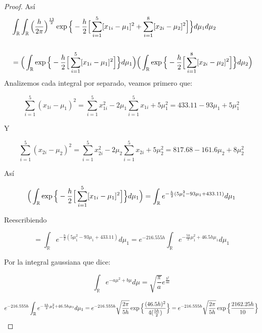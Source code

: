 \documentclass[11pt,letterpaper]{article}
\begin{document}
\begin{proof}
    Así
    \begin{align*}
        &\int_{\mathbb{R}}\int_{\mathbb{R}}\Big{(}\frac{h}{2\pi}\Big{)}^\frac{13}{2}\exp\Big{\{}-\frac{h}{2}\Big{[}\sum_{i=1}^5[x_{1i}-\mu_1]^2+\sum_{i=1}^8[x_{2i}-\mu_2]^2\Big{]}\Big{\}}d\mu_1d\mu_2 \\
        \,\\
        &=\Big{(}\int_{\mathbb{R}}\exp\Big{\{}-\frac{h}{2}\Big{[}\sum_{i=1}^5[x_{1i}-\mu_1]^2\Big{]}\Big{\}}d\mu_1\Big{)}\Big{(}\int_{\mathbb{R}}\exp\Big{\{}-\frac{h}{2}\Big{[}\sum_{i=1}^8[x_{2i}-\mu_2]^2\Big{]}\Big{\}}d\mu_2\Big{)}
    \end{align*}
    Analizemos cada integral por separado, veamos primero que:

    \begin{equation*}
        \sum_{i=1}^5(x_{1i}-\mu_1)^2=\sum_{i=1}^5x_{1i}^2-2\mu_1\sum_{i=1}^5x_{1i}+5\mu_1^2=433.11-93\mu_1+5\mu_1^2
    \end{equation*}

    Y

    \begin{equation*}
        \sum_{i=1}^5(x_{2i}-\mu_2)^2=\sum_{i=1}^5x_{2i}^2-2\mu_2\sum_{i=1}^5x_{2i}+5\mu_2^2=817.68-161.6\mu_2+8\mu_2^2
    \end{equation*}

    Así
    
    \begin{equation*}
        \Big{(}\int_{\mathbb{R}}\exp\Big{\{}-\frac{h}{2}\Big{[}\sum_{i=1}^5[x_{1i}-\mu_1]^2\Big{]}\Big{\}}d\mu_1\Big{)}=\int_{\mathbb{R}}e^{-\frac{h}{2}(5\mu_1^2-93\mu_1+433.11)}d\mu_1
    \end{equation*}

    Reescribiendo

    \begin{equation*}
        =\int_{\mathbb{R}}e^{-\frac{h}{2}(5\mu_1^2-93\mu_1+433.11)}d\mu_1=e^{-216.555h}\int_{\mathbb{R}}e^{-\frac{5h}{2}\mu_1^2+46.5h\mu_1}d\mu_1
    \end{equation*}

    Por la integral gaussiana que dice:

    \[
    \int_\mathbb{R}e^{-a\mu^2+b\mu}d\mu=\sqrt{\frac{\pi}{a}}e^{\frac{b^2}{4a}}
    \]

    \begin{equation*}
        e^{-216.555h}\int_{\mathbb{R}}e^{-\frac{5h}{2}\mu_1^2+46.5h\mu_1}d\mu_1=e^{-216.555h}\sqrt{\frac{2\pi}{5h}}\exp\Big{\{}\frac{(46.5h)^2}{4(\frac{5h}{2})}\Big{\}}=e^{-216.555h}\sqrt{\frac{2\pi}{5h}}\exp\Big{\{}\frac{2162.25h}{10}\Big{\}}
    \end{equation*}


\end{proof}
\end{document}
